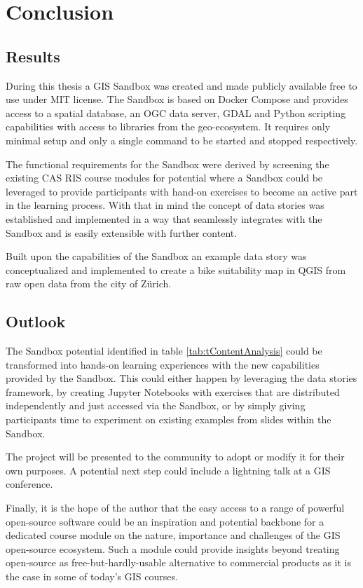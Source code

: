 \documentclass[11pt, a4paper, oneside, parskip=full-]{scrartcl}
\begin{document}
\section{Conclusion}

\subsection{Results}
During this thesis a GIS Sandbox was created and made publicly available free to
use under MIT license\cite{osgissandbox}. The Sandbox is based on Docker
Compose and provides access to a spatial database, an OGC data server, GDAL and
Python scripting capabilities with access to libraries from the geo-ecosystem.
It requires only minimal setup and only a single command to be started and
stopped respectively.

The functional requirements for the Sandbox were derived by screening the
existing CAS RIS course modules for potential where a Sandbox could be leveraged
to provide participants with hand-on exercises to become an active part in the
learning process. With that in mind the concept of data stories was established
and implemented in a way that seamlessly integrates with the Sandbox and is
easily extensible with further content.

Built upon the capabilities of the Sandbox an example data story was
conceptualized and implemented to create a bike suitability map in QGIS from raw
open data from the city of Zürich.

\subsection{Outlook}
The Sandbox potential identified in table \ref{tab:tContentAnalysis} could be
transformed into hands-on learning experiences with the new capabilities
provided by the Sandbox. This could either happen by leveraging the data stories
framework, by creating Jupyter Notebooks with exercises that are distributed
independently and just accessed via the Sandbox, or by simply giving
participants time to experiment on existing examples from slides within the
Sandbox.

The project will be presented to the community to adopt or modify it for their
own purposes. A potential next step could include a lightning talk at a GIS
conference.

Finally, it is the hope of the author that the easy access to a range of
powerful open-source software could be an inspiration and potential backbone for
a dedicated course module on the nature, importance and challenges of the GIS
open-source ecosystem. Such a module could provide insights beyond treating
open-source as free-but-hardly-usable alternative to commercial products as it
is the case in some of today's GIS courses.

\newpage
\printbibliography
\end{document}
